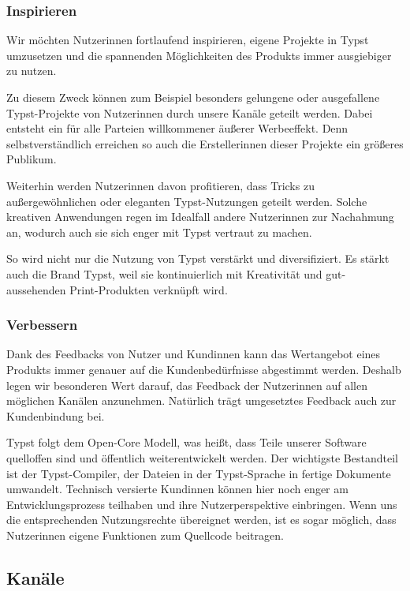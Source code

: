 \documentclass[11pt, a4paper]{article}
\newcommand{\gender}{\raisebox{-.25em}{*}}
\renewcommand{\glossary} {\marginsymbol{\textbf{↪}}}
\newcommand{\marginsymbol}[1] {\protect\marginsymbolhelper{#1}}
\newcommand{\marginsymbolhelper}[1] {\tabto*{-1cm}\makebox[0cm]{#1}\tabto*{\TabPrevPos}}
\begin{document}
\subsubsection*{Inspirieren}

Wir möchten Nutzer\gender{}innen fortlaufend inspirieren, eigene Projekte in Typst umzusetzen und die spannenden Möglichkeiten des Produkts immer ausgiebiger zu nutzen.

Zu diesem Zweck können zum Beispiel besonders gelungene oder ausgefallene Typst-Projekte von Nutzer\gender{}innen durch unsere Kanäle geteilt werden. Dabei entsteht ein für alle Parteien willkommener äußerer Werbeeffekt. Denn selbstverständlich erreichen so auch die Ersteller\gender{}innen dieser Projekte ein größeres Publikum.

Weiterhin werden Nutzer\gender{}innen davon profitieren, dass Tricks zu außergewöhnlichen oder eleganten Typst-Nutzungen geteilt werden. Solche kreativen Anwendungen regen im Idealfall andere Nutzer\gender{}innen zur Nachahmung an, wodurch auch sie sich enger mit Typst vertraut zu machen.

So wird nicht nur die Nutzung von Typst verstärkt und diversifiziert. Es stärkt auch die Brand Typst, weil sie kontinuierlich mit Kreativität und gut-aussehenden Print-Produkten verknüpft wird.

\subsubsection*{Verbessern}

Dank des Feedbacks von Nutzer\gender{} und Kund\gender{}innen kann das Wertangebot eines Produkts immer genauer auf die Kundenbedürfnisse abgestimmt werden. Deshalb legen wir besonderen Wert darauf, das Feedback der Nutzer\gender{}innen auf allen möglichen Kanälen anzunehmen. Natürlich trägt umgesetztes Feedback auch zur Kundenbindung bei.

Typst folgt dem Open-Core Modell, was heißt, dass Teile unserer Software quelloffen sind und öffentlich weiterentwickelt werden. Der wichtigste Bestandteil ist der \glossary Typst-Compiler, der Dateien in der Typst-Sprache in fertige Dokumente umwandelt. Technisch versierte Kund\gender{}innen können hier noch enger am Entwicklungsprozess teilhaben und ihre Nutzerperspektive einbringen. Wenn uns die entsprechenden Nutzungsrechte übereignet werden, ist es sogar möglich, dass Nutzer\gender{}innen eigene Funktionen zum Quellcode beitragen.


\newpage
\subsection*{Kanäle}
\end{document}
